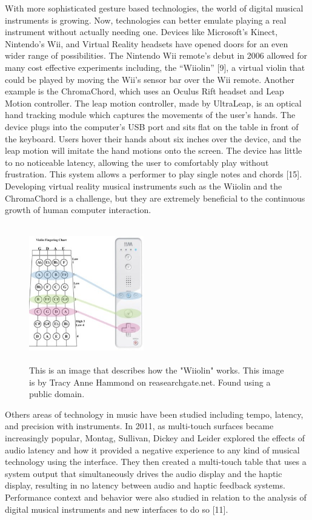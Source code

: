 \documentclass[conference,compsoc]{IEEEtran}
\begin{document}
With more sophisticated gesture based technologies, the world of digital musical instruments is growing. Now, technologies can better emulate playing a real instrument without actually needing one. Devices like Microsoft’s Kinect, Nintendo’s Wii, and Virtual Reality headsets have opened doors for an even wider range of possibilities. The Nintendo Wii remote’s debut in 2006 allowed for many cost effective experiments including, the “Wiiolin” [9], a virtual violin that could be played by moving the Wii’s sensor bar over the Wii remote. Another example is the ChromaChord, which uses an Oculus Rift headset and Leap Motion controller. The leap motion controller, made by UltraLeap, is an optical hand tracking module which captures the movements of the user’s hands. The device plugs into the computer’s USB port and sits flat on the table in front of the keyboard. Users hover their hands about six inches over the device, and the leap motion will imitate the hand motions onto the screen. The device has little to no noticeable latency, allowing the user to comfortably play without frustration. This system allows a performer to play single notes and chords [15]. Developing virtual reality musical instruments such as the Wiiolin and the ChromaChord is a challenge, but they are extremely beneficial to the continuous growth of human computer interaction.

\begin{figure}[h]
\centering
\includegraphics[width=5cm, height=6cm]{IEEEtran/Wiiolin.jpg}
\centering
\caption{This is an image that describes how the "Wiiolin" works. This image is by Tracy Anne Hammond on reasearchgate.net. Found using a public domain.}
\end{figure}

Others areas of technology in music have been studied including tempo, latency, and precision with instruments. In 2011, as multi-touch surfaces became increasingly popular, Montag, Sullivan, Dickey and Leider explored the effects of audio latency and how it provided a negative experience to any kind of musical technology using the interface. They then created a multi-touch table that uses a system output that simultaneously drives the audio display and the haptic display, resulting in no latency between audio and haptic feedback systems. Performance context and behavior were also studied in relation to the analysis of digital musical instruments and new interfaces to do so [11].
\end{document}
